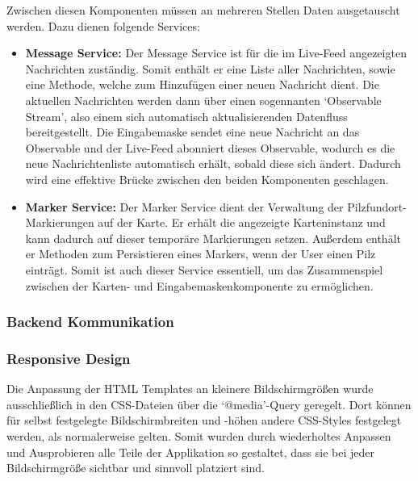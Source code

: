 \documentclass[../main.tex]{subfiles} %
\begin{document}
Zwischen diesen Komponenten müssen an mehreren Stellen Daten ausgetauscht werden. Dazu dienen folgende Services:

\begin{itemize}

	\item \textbf{Message Service:}
	      Der Message Service ist für die im Live-Feed angezeigten Nachrichten zuständig. Somit enthält er eine Liste aller Nachrichten, sowie eine Methode,
        welche zum Hinzufügen einer neuen Nachricht dient. Die aktuellen Nachrichten werden dann über einen sogennanten `Observable Stream', also einem
        sich automatisch aktualisierenden Datenfluss bereitgestellt. Die Eingabemaske sendet eine neue Nachricht an das Observable und der Live-Feed
        abonniert dieses Observable, wodurch es die neue Nachrichtenliste automatisch erhält, sobald diese sich ändert. Dadurch wird eine effektive 
        Brücke zwischen den beiden Komponenten geschlagen.

  \item \textbf{Marker Service:}
        Der Marker Service dient der Verwaltung der Pilzfundort-Markierungen auf der Karte. Er erhält die angezeigte Karteninstanz und kann dadurch auf 
        dieser temporäre Markierungen setzen. Außerdem enthält er Methoden zum Persistieren eines Markers, wenn der User einen Pilz einträgt. Somit ist 
        auch dieser Service essentiell, um das Zusammenspiel zwischen der Karten- und Eingabemaskenkomponente zu ermöglichen.

\end{itemize}

\subsubsection{Backend Kommunikation}  %

\subsubsection{Responsive Design}

Die Anpassung der HTML Templates an kleinere Bildschirmgrößen wurde ausschließlich in den CSS-Dateien über die `@media'-Query geregelt. Dort können für
selbst festgelegte Bildschirmbreiten und -höhen andere CSS-Styles festgelegt werden, als normalerweise gelten. Somit wurden durch wiederholtes Anpassen
und Ausprobieren alle Teile der Applikation so gestaltet, dass sie bei jeder Bildschirmgröße sichtbar und sinnvoll platziert sind.
\end{document}
